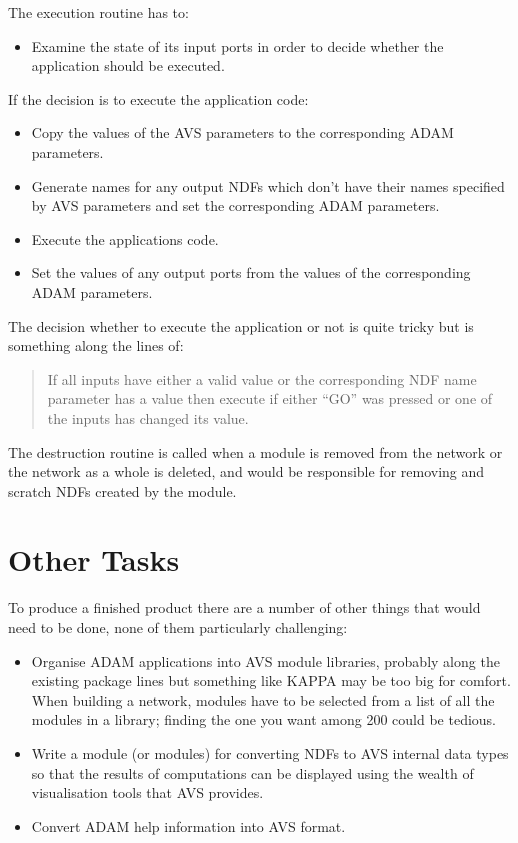 The execution routine has to:
\begin{itemize}

\item Examine the state of its input ports in order to decide whether the
  application should be executed.

\end{itemize}
If the decision is to execute the application code:
\begin{itemize}

\item Copy the values of the AVS parameters to the corresponding ADAM parameters.

\item Generate names for any output NDFs which don't have their names specified 
  by AVS parameters and set the corresponding ADAM parameters.

\item Execute the applications code.

\item Set the values of any output ports from the values of the corresponding ADAM
  parameters.

\end{itemize}
The decision whether to execute the application or not is quite tricky but is
something along the lines of:
\begin{quote}
	If all inputs have either a valid value or the corresponding NDF 
	name parameter has a value then execute if either ``GO'' was 
	pressed or one of the inputs has changed its value. 
\end{quote}

The destruction routine is called when a module is removed from the network or
the network as a whole is deleted, and would be responsible for removing and
scratch NDFs created by the module.

\section{Other Tasks}

To produce a finished product there are a number of other things that would need
to be done, none of them particularly challenging:

\begin{itemize}

\item Organise ADAM applications into AVS module libraries, probably along the
  existing package lines but something like KAPPA may be too big for comfort.
  When building a network, modules have to be selected from a list of all the
  modules in a library; finding the one you want among 200 could be tedious.

\item Write a module (or modules) for converting NDFs to AVS internal data types so
  that the results of computations can be displayed using the wealth of
  visualisation tools that AVS provides.

\item Convert ADAM help information into AVS format.

\end{itemize}

